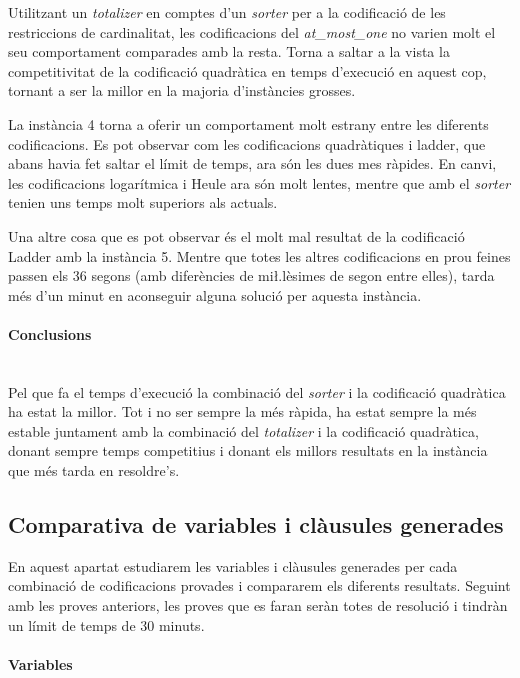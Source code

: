 \documentclass[11pt,a4paper,twoside]{report}
\begin{document}
  Utilitzant un \textit{totalizer} en comptes d'un \textit{sorter} per a la codificació de les restriccions de cardinalitat, les codificacions del \textit{at\_most\_one} no varien molt el seu comportament comparades amb la resta.
  Torna a saltar a la vista la competitivitat de la codificació quadràtica en temps d'execució en aquest cop, tornant a ser la millor en la majoria d'instàncies grosses. 

  La instància 4 torna a oferir un comportament molt estrany entre les diferents codificacions. Es pot observar com les codificacions quadràtiques i ladder, que abans havia fet saltar el límit de temps, 
  ara són les dues mes ràpides. En canvi, les codificacions logarítmica i Heule ara són molt lentes, mentre que amb el \textit{sorter} tenien uns temps molt superiors als actuals.

  Una altre cosa que es pot observar és el molt mal resultat de la codificació Ladder amb la instància 5. Mentre que totes les altres codificacions en prou feines passen els 36 segons 
  (amb diferències de mi\l.lèsimes de segon entre elles), tarda més d'un minut en aconseguir alguna solució per aquesta instància.

  \paragraph*{Conclusions} ~\\

  Pel que fa el temps d'execució la combinació del \textit{sorter} i la codificació quadràtica ha estat la millor.
   Tot i no ser sempre la més ràpida, ha estat sempre la més estable juntament amb la combinació del \textit{totalizer} 
   i la codificació quadràtica, donant sempre temps competitius i donant els millors resultats en la instància que més tarda en resoldre's.

  

  \subsection{Comparativa de variables i clàusules generades}

  En aquest apartat estudiarem les variables i clàusules generades per cada combinació de codificacions provades i compararem els diferents resultats. Seguint amb les proves anteriors, les proves que es faran seràn totes de resolució i tindràn un límit de temps de 30 minuts.
  
  \paragraph*{Variables} ~\\
\end{document}
